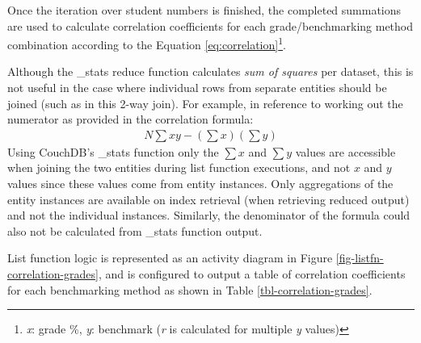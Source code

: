 Once the iteration over student numbers is finished, the completed summations are used to calculate correlation coefficients for each grade/benchmarking method combination according to the Equation \ref{eq:correlation}\footnote{\textit{x}: grade \%, \textit{y}: benchmark (\textit{r} is calculated for multiple \textit{y} values)}.

Although the \_stats reduce function calculates \textit{sum of squares} per dataset, this is not useful in the case where individual rows from separate entities should be joined (such as in this 2-way join). For example, in reference to working out the numerator as provided in the correlation formula:
\begin{align}
    N\sum{xy} - (\sum{x})(\sum{y})
\end{align}
Using CouchDB's \_stats function only the $\sum{x}$ and $\sum{y}$ values are accessible when joining the two entities during list function executions, and not $x$ and $y$ values since these values come from entity instances. Only aggregations of the entity instances are available on index retrieval (when retrieving reduced output) and not the individual instances. Similarly, the denominator of the formula could also not be calculated from \_stats function output.

List function logic is represented as an activity diagram in Figure \ref{fig-listfn-correlation-grades}, and is configured to output a table of correlation coefficients for each benchmarking method as shown in Table \ref{tbl-correlation-grades}.


